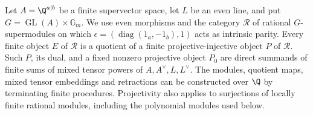 \begin{lemma}
\label{c:super-projective-tensors}
Let $A=\Q^{a|b}$ be a finite supervector space, let $L$ be an even
line, and put $G=\operatorname{GL}(A)\times\mathbb G_m$.
We use even morphisms and the category $\mathcal R$ of rational
$G$-supermodules on which
$\epsilon=(\operatorname{diag}(1_a,-1_b),1)$ acts as intrinsic parity.
Every finite object $E$ of $\mathcal R$ is a quotient of a finite
projective-injective object $P$ of $\mathcal R$.  Such $P$, its dual,
and a fixed nonzero projective object $P_0$ are direct summands of
finite sums of mixed tensor powers of $A,A^\vee,L,L^\vee$.
The modules, quotient maps, mixed tensor embeddings and retractions
can be constructed over $\Q$ by terminating finite procedures.
Projectivity also applies to surjections of locally finite rational
modules, including the polynomial modules used below.
\end{lemma}


